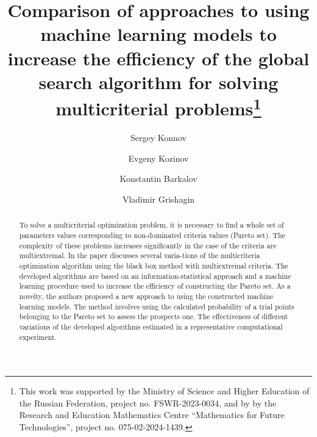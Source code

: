 \documentclass[runningheads]{llncs}
\begin{document}
%
\title{Comparison of approaches to using machine learning models to increase the efficiency of the global search algorithm for solving multicriterial problems\thanks{This work was supported by the Ministry of Science and Higher Education of the Russian Federation, project no. FSWR-2023-0034, and by by the Research and Education Mathematics Centre ``Mathematics for Future Technologies'', project no. 075-02-2024-1439.} }
%
%
\author{Sergey Konnov \and
Evgeny Kozinov \Letter{} \and
Konstantin Barkalov \Letter{} \and
Vladimir Grishagin}
%

%
\maketitle

%
\begin{abstract}
To solve a multicriterial optimization problem, it is necessary to find a whole set of parameters values corresponding to non-dominated criteria values (Pareto set). The complexity of these problems increases significantly in the case of the criteria are multiextremal. In the paper discusses several varia-tions of the multicriteria optimization algorithm using the black box method with multiextremal criteria. The developed algorithms are based on an information-statistical approach and a machine learning procedure used to increase the efficiency of constructing the Pareto set. As a novelty, the authors proposed a new approach to using the constructed machine learning models. The method involves using the calculated probability of a trial points belonging to the Pareto set to assess the prospects one. The effectiveness of different variations of the developed algorithms estimated in a representative computational experiment.

\end{abstract}
%
%
%
\end{document}
